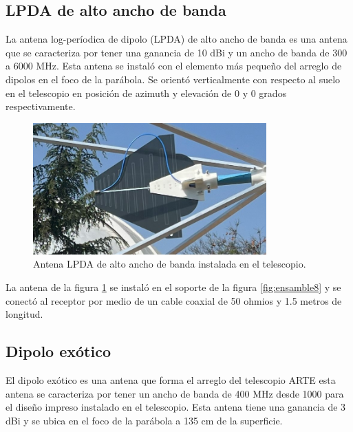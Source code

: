 \subsection{LPDA de alto ancho de banda}

La antena log-períodica de dipolo (LPDA) de alto ancho de banda es una antena que se caracteriza por tener una ganancia de 10 dBi y un ancho de banda de 300 a 6000 MHz. Esta antena se instaló con el elemento más pequeño del arreglo de dipolos en el foco de la parábola. Se orientó verticalmente con respecto al suelo en el telescopio en posición de azimuth y elevación de 0 y 0 grados respectivamente.\\

\begin{figure}
    \centering
    \includegraphics[width=0.8\textwidth]{img/lpda}
    \caption{Antena LPDA de alto ancho de banda instalada en el telescopio.}
    \label{fig:ensamble13}
\end{figure}

La antena de la figura \ref{fig:ensamble13} se instaló en el soporte de la figura \ref{fig:ensamble8} y se conectó al receptor por medio de un cable coaxial de 50 ohmios y 1.5 metros de longitud.\\

\subsection{Dipolo exótico}

El dipolo exótico es una antena que forma el arreglo del telescopio ARTE \cite{Gallardo2023} esta antena se caracteriza por tener un ancho de banda de 400 MHz desde 1000 para el diseño impreso instalado en el telescopio. Esta antena tiene una ganancia de 3 dBi y se ubica en el foco de la parábola a 135 cm de la superficie.\\

